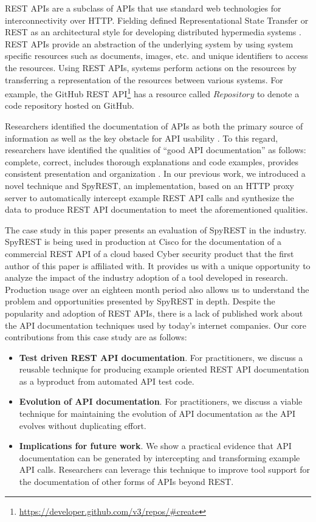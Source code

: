 \documentclass[10pt, conference]{IEEEtran}
\begin{document}
REST APIs are a subclass of APIs that use standard web technologies for interconnectivity over HTTP. Fielding defined Representational State Transfer or REST as an architectural style for developing distributed hypermedia systems \cite{Fielding_rest}. REST APIs provide an abstraction of the underlying system by using system specific resources such as documents, images, etc. and unique identifiers to access the resources. Using REST APIs, systems perform actions on the resources by transferring a representation of the resources between various systems. For example, the GitHub REST API\footnote{\url{https://developer.github.com/v3/repos/#create}} has a resource called $Repository$ to denote a code repository hosted on GitHub.

Researchers identified the documentation of APIs as both the primary source of information as well as the key obstacle for API usability \cite{Robillard_what_makes}. To this regard, researchers have identified the qualities of ``good API documentation'' as follows: complete, correct, includes thorough explanations and code examples, provides consistent presentation and organization \cite{Robillard_what_makes,Myers_study}. In our previous work, we introduced a novel technique and SpyREST, an implementation, based on an HTTP proxy server to automatically intercept example REST API calls and synthesize the data to produce REST API documentation to meet the aforementioned qualities.

The case study in this paper presents an evaluation of SpyREST in the industry. SpyREST is being used in production at Cisco for the documentation of a commercial REST API of a cloud based Cyber security product that the first author of this paper is affiliated with. It provides us with a unique opportunity to analyze the impact of the industry adoption of a tool developed in research. Production usage over an eighteen month period also allows us to understand the problem and opportunities presented by SpyREST in depth. Despite the popularity and adoption of REST APIs, there is a lack of published work about the API documentation techniques used by today's internet companies. Our core contributions from this case study are as follows:

\begin{itemize}
  \item \textbf{Test driven REST API documentation}. For practitioners, we discuss a reusable technique for producing example oriented REST API documentation as a byproduct from automated API test code.
  \item \textbf{Evolution of API documentation}. For practitioners, we discuss a viable technique for maintaining the evolution of API documentation as the API evolves without duplicating effort.
  \item \textbf{Implications for future work}. We show a practical evidence that API documentation can be generated by intercepting and transforming example API calls. Researchers can leverage this technique to improve tool support for the documentation of other forms of APIs beyond REST.
\end{itemize}
\end{document}
